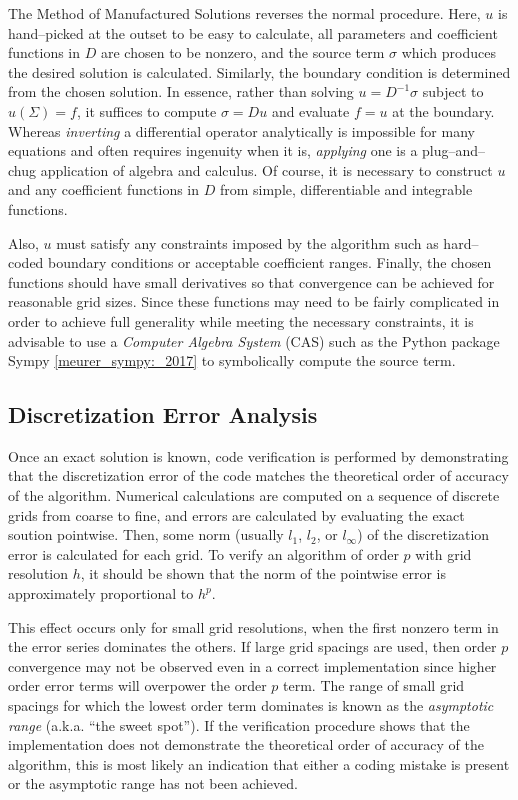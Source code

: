 The Method of Manufactured Solutions reverses the normal procedure.
Here, $u$ is hand--picked at the outset to be easy to calculate, all parameters and coefficient functions in $D$ are chosen to be nonzero, and the source term $\sigma$ which produces the desired solution is calculated.
Similarly, the boundary condition is determined from the chosen solution.
In essence, rather than solving $u = D^{-1}\sigma$ subject to $u(\Sigma)=f$, it suffices to compute $\sigma = Du$ and evaluate $f=u$ at the boundary.
Whereas \textit{inverting} a differential operator analytically is impossible for many equations and often requires ingenuity when it is, \textit{applying} one is a plug--and--chug application of algebra and calculus.
Of course, it is necessary to construct $u$ and any coefficient functions in $D$ from simple, differentiable and integrable functions.

Also, $u$ must satisfy any constraints imposed by the algorithm such as hard--coded boundary conditions or acceptable coefficient ranges.
Finally, the chosen functions should have small derivatives so that convergence can be achieved for reasonable grid sizes.
Since these functions may need to be fairly complicated in order to achieve full generality while meeting the necessary constraints, it is advisable to use a \textit{Computer Algebra System} (CAS) such as the Python package Sympy \ref{meurer_sympy:_2017} to symbolically compute the source term.

\subsection{Discretization Error Analysis}
Once an exact solution is known, code verification is performed by demonstrating that the discretization error of the code matches the theoretical order of accuracy of the algorithm.
Numerical calculations are computed on a sequence of discrete grids from coarse to fine, and errors are calculated by evaluating the exact soution pointwise.
Then, some norm (usually $l_1$, $l_2$, or $l_\infty$) of the discretization error is calculated for each grid.
To verify an algorithm of order $p$ with grid resolution $h$, it should be shown that the norm of the pointwise error is approximately proportional to $h^p$.

This effect occurs only for small grid resolutions, when the first nonzero term in the error series dominates the others.
If large grid spacings are used, then order $p$ convergence may not be observed even in a correct implementation since higher order error terms will overpower the order $p$ term.
The range of small grid spacings for which the lowest order term dominates is known as the \textit{asymptotic range} (a.k.a. ``the sweet spot'').
If the verification procedure shows that the implementation does not demonstrate the theoretical order of accuracy of the algorithm, this is most likely \cite{roache_verification_1998-1} an indication that either a coding mistake is present or the asymptotic range has not been achieved.

